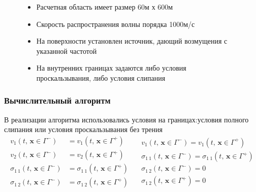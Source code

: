 \documentclass[unicode,aspectratio=43]{beamer}
\begin{document}
\begin{frame}
\begin{figure}[ht!]
\begin{minipage}{0.49\textwidth}
\begin{itemize}
		\item Расчетная область имеет размер 60м х 600м
		
		\item Скорость распространения волны порядка 1000м/с
		
		\item На поверхности установлен источник, дающий возмущения с указанной частотой 
		
		\item На внутренних границах задаются либо условия проскальзывания, либо условия слипания
	\end{itemize}
		\end{minipage}
	\end{figure}

\end{frame}

\begin{frame}\frametitle{Вычислительный алгоритм}
	В реализации алгоритма использовались условия на границах:\guillemotleft{}условия полного слипания\guillemotright{} или \guillemotleft{}условия проскальзывания без
	трения\guillemotright{}
	\begin{equation*} 
	\begin{split}
	v_{1} \left( t, \,{\mathbf{x}} \in \Gamma^- \right) &= v_{1} \left( t, \,{\mathbf{x}} \in \Gamma^+ \right) \nonumber
	\\
	v_{2} \left( t, \,{\mathbf{x}} \in \Gamma^- \right) &= v_{2} \left( t, \,{\mathbf{x}} \in \Gamma^+ \right) \nonumber
	\\
	\sigma_{1\:1} \left( t, \,{\mathbf{x}} \in \Gamma^- \right) &= \sigma_{1\:1} \left( t, \,{\mathbf{x}} \in \Gamma^+ \right) 
	\\
	\sigma_{1\:2} \left( t, \,{\mathbf{x}} \in \Gamma^- \right) &= \sigma_{1\:2} \left( t, \,{\mathbf{x}} \in \Gamma^+ \right) \nonumber
	\end{split}
	\quad
	\begin{split}
	v_{1} \left( t, \,{\mathbf{x}} \in \Gamma^- \right) = v_{1} \left( t, \,{\mathbf{x}} \in \Gamma^+ \right) \nonumber
	\\
	\sigma_{1\:1} \left( t, \,{\mathbf{x}} \in \Gamma^- \right) = \sigma_{1\:1} \left( t, \,{\mathbf{x}} \in \Gamma^+ \right) 
	\\
	\sigma_{1\:2} \left( t, \,{\mathbf{x}} \in \Gamma^- \right) = 0 \nonumber
	\\
	\sigma_{1\:2} \left( t, \,{\mathbf{x}} \in \Gamma^+ \right) = 0 \nonumber
	\end{split}
	\end{equation*}
\end{frame}
\end{document}
